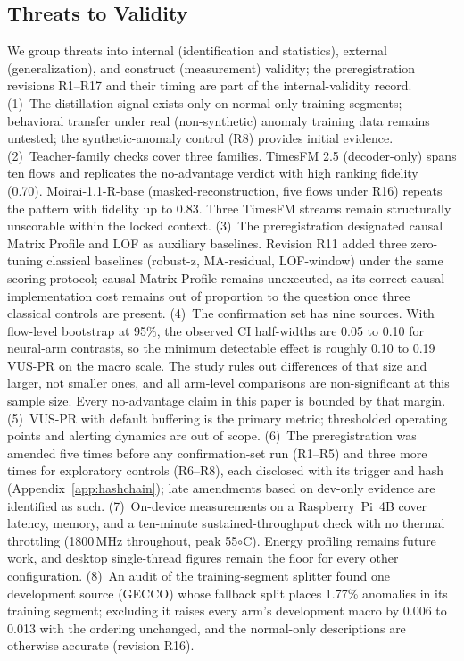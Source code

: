 \documentclass[pdflatex,sn-basic,Numbered]{sn-jnl}
\begin{document}
\subsection{Threats to Validity}\label{sec:limitations}
\noindent
We group threats into internal (identification and statistics),
external (generalization), and construct (measurement) validity;
the preregistration revisions R1--R17 and their timing are part of
the internal-validity record.
(1)~The distillation signal exists only on normal-only training segments;
behavioral transfer under real (non-synthetic) anomaly training data remains untested; the synthetic-anomaly control (R8) provides initial evidence.
(2)~Teacher-family checks cover three families.
TimesFM 2.5 (decoder-only) spans ten flows and replicates the no-advantage
verdict with high ranking fidelity (0.70).
Moirai-1.1-R-base (masked-reconstruction, five flows under R16) repeats
the pattern with fidelity up to 0.83.
Three TimesFM streams remain structurally unscorable within the locked
context.
(3)~The preregistration designated causal Matrix Profile and LOF as
auxiliary baselines. Revision R11 added three zero-tuning classical
baselines (robust-z, MA-residual, LOF-window) under the same scoring
protocol; causal Matrix Profile remains unexecuted, as its correct
causal implementation cost remains out of proportion to the question
once three classical controls are present.
(4)~The confirmation set has nine sources. With flow-level bootstrap at
95\%, the observed CI half-widths are 0.05 to 0.10 for neural-arm
contrasts, so the minimum detectable effect is roughly 0.10 to 0.19
VUS-PR on the macro scale. The study rules out differences of that
size and larger, not smaller ones, and all arm-level comparisons are
non-significant at this sample size. Every no-advantage claim in this
paper is bounded by that margin.
(5)~VUS-PR with default buffering is the primary metric; thresholded
operating points and alerting dynamics are out of scope.
(6)~The preregistration was amended five times before any
confirmation-set run (R1--R5) and three more times for exploratory
controls (R6--R8), each disclosed with its trigger and hash
(Appendix~\ref{app:hashchain}); late amendments based on dev-only
evidence are identified as such.
(7)~On-device measurements on a Raspberry~Pi~4B cover latency, memory,
and a ten-minute sustained-throughput check with no thermal throttling
(1800\,MHz throughout, peak 55$\circ$C). Energy profiling remains future
work, and desktop single-thread figures remain the floor for every
other configuration.
(8)~An audit of the training-segment splitter found one development
source (GECCO) whose fallback split places 1.77\% anomalies in its
training segment; excluding it raises every arm's development macro by
0.006 to 0.013 with the ordering unchanged, and the normal-only
descriptions are otherwise accurate (revision R16).
\end{document}
